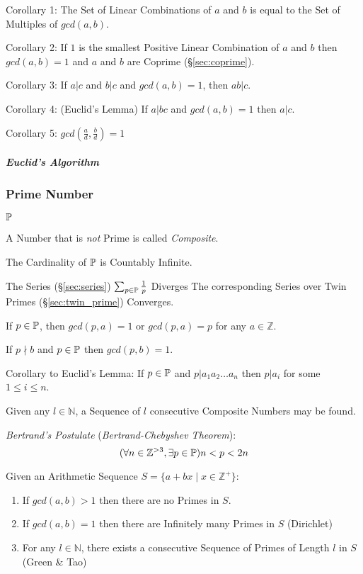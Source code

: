 Corollary 1: The Set of Linear Combinations of $a$ and $b$ is equal to
the Set of Multiples of $gcd(a,b)$.

Corollary 2: If $1$ is the smallest Positive Linear Combination of $a$
and $b$ then $gcd(a,b) = 1$ and $a$ and $b$ are Coprime
(\S\ref{sec:coprime}).

Corollary 3: If $a|c$ and $b|c$ and $gcd(a,b) = 1$, then $ab|c$.

Corollary 4: (Euclid's Lemma) If $a | bc$ and $gcd(a,b) = 1$ then
$a|c$.

Corollary 5: $gcd(\frac{a}{d}, \frac{b}{d}) = 1$



\subparagraph{Euclid's Algorithm}\label{sec:euclids_algorithm}\hfill



\subsubsection{Prime Number}\label{sec:prime_number}

$\mathbb{P}$

A Number that is \emph{not} Prime is called \emph{Composite}.

The Cardinality of $\mathbb{P}$ is Countably Infinite.

The Series (\S\ref{sec:series}) $\sum_{p \in \mathbb{P}} \frac{1}{p}$
Diverges The corresponding Series over Twin Primes
(\S\ref{sec:twin_prime}) Converges.

If $p \in \mathbb{P}$, then $gcd(p,a) = 1$ or $gcd(p,a) = p$ for any
$a \in \mathbb{Z}$.

If $p \nmid b$ and $p \in \mathbb{P}$ then $gcd (p,b) = 1$.

Corollary to Euclid's Lemma: If $p \in \mathbb{P}$ and $p|a_1 a_2
\ldots a_n$ then $p|a_i$ for some $1 \leq i \leq n$.

Given any $l \in \mathbb{N}$, a Sequence of $l$ consecutive Composite
Numbers may be found.

\emph{Bertrand's Postulate} (\emph{Bertrand-Chebyshev Theorem}):
\[
  (\forall n \in \mathbb{Z}^{>3}, \exists p \in \mathbb{P}) n < p < 2n
\]

Given an Arithmetic Sequence $S = \{ a + bx \;|\; x \in \mathbb{Z}^+\}$:
\begin{enumerate}
  \item If $gcd(a,b) > 1$ then there are no Primes in $S$.
  \item If $gcd(a,b) = 1$ then there are Infinitely many Primes in $S$
    (Dirichlet)
  \item For any $l \in \mathbb{N}$, there exists a consecutive
    Sequence of Primes of Length $l$ in $S$ (Green \& Tao)
\end{enumerate}

